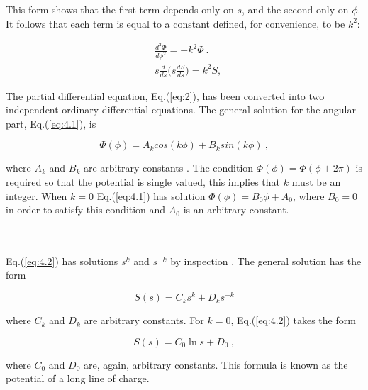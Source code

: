 \documentclass[a4paper]{jpconf}
\begin{document}
\noindent This form shows that the first term depends only on $s$, and the second only on $\phi$. It follows that  each term is equal to a constant defined, for convenience, to be $k^2$:

\begin{subequations}
\begin{align}
&\frac{d^2 \Phi}{d \phi^2} = - k^2 \Phi ~. \label{eq:4.1}\\
&s\frac{d}{ds}\bigg(s \frac{dS}{ds}\bigg) = k^2 S, \label{eq:4.2}
\end{align}
\label{eq:4}
\end{subequations} 

\noindent The partial differential equation, Eq.(\ref{eq:2}), has been converted into two independent ordinary differential equations. The general solution for the angular part, Eq.(\ref{eq:4.1}), is

\begin{equation}
\Phi(\phi) = A_k cos(k \phi) + B_k sin(k \phi)~,
\label{eq:phi}
\end{equation}

\noindent where $A_k$ and $B_k$ are arbitrary constants \cite{RHB-MathematicalMethods}. The condition $\Phi(\phi) = \Phi(\phi + 2 \pi)$ is required so that the potential is single valued, this implies that $k$ must be an integer. %
When $k = 0$ Eq.(\ref{eq:4.1}) has solution $\Phi(\phi) = B_0 \phi + A_0$, where $B_0 = 0$ in order to satisfy this condition and $A_0$ is an arbitrary constant. \\ \\ \\ \par 
Eq.(\ref{eq:4.2}) has solutions $s^k$ and $s^{-k}$ by inspection \cite{griffiths-introElec}. The general solution has the form

\begin{equation}
S(s) = C_k s^k + D_k s^{-k}
\label{eq:s}
\end{equation} 

\noindent where $C_k$ and $D_k$ are arbitrary constants. For $k = 0$, Eq.(\ref{eq:4.2}) takes the form

\begin{equation}
S(s) = C_0 \ln{s} + D_0~,
\label{eq:s2}
\end{equation}

\noindent where $C_0$ and $D_0$ are, again, arbitrary constants. This formula is known as the potential of a long line of charge. \par
\end{document}
